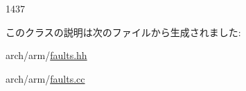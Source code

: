 \begin{DoxyCode}
1437 {}
\end{DoxyCode}


このクラスの説明は次のファイルから生成されました:\begin{DoxyCompactItemize}
\item 
arch/arm/\hyperlink{arch_2arm_2faults_8hh}{faults.hh}\item 
arch/arm/\hyperlink{arch_2arm_2faults_8cc}{faults.cc}\end{DoxyCompactItemize}
